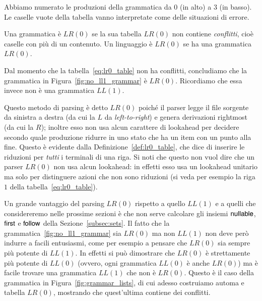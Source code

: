 Abbiamo numerato le produzioni della grammatica da $0$ (in alto)
a $3$ (in basso). Le caselle vuote della tabella vanno interpretate come delle
situazioni di errore.
%
\begin{definition}\label{def:lr0_grammar}
Una grammatica \`e $\mathit{LR}(0)$ se la sua tabella $\mathit{LR}(0)$
non contiene
\emph{conflitti},
cio\`e caselle con pi\`u di un contenuto. Un linguaggio \`e $\mathit{LR}(0)$ se
ha una grammatica $\mathit{LR}(0)$.
\end{definition}
%
\noindent
Dal momento che la tabella~\eqref{eq:lr0_table} non ha conflitti, concludiamo
che la grammatica in Figura~\ref{fig:no_ll1_grammar} \`e $\mathit{LR}(0)$.
Ricordiamo che essa invece non \`e una grammatica $\mathit{LL}(1)$.

Questo metodo di parsing \`e detto $\mathit{LR}(0)$ poich\'e il parser
legge il file sorgente da sinistra a destra (da cui la
$L$ da \emph{left-to-right}) e genera derivazioni rightmost (da cui la
$R$); inoltre esso non usa alcun carattere di lookahead per decidere
secondo quale produzione ridurre in uno stato che ha un item
con un punto alla fine. Questo \`e evidente dalla
Definizione~\ref{def:lr0_table}, che dice di inserire le riduzioni
per \emph{tutti} i terminali di una riga. Si noti che questo non vuol
dire che un parser $\mathit{LR}(0)$ non usa alcun lookahead: in effetti esso
usa un lookahead unitario ma solo per distinguere azioni che non
sono riduzioni (si veda per esempio la riga $1$ della
tabella~\eqref{eq:lr0_table}).

Un grande vantaggio del parsing $\mathit{LR}(0)$ rispetto a quello
$\mathit{LL}(1)$
e a quelli che considereremo nelle prossime sezioni \`e che non serve calcolare
gli insiemi $\mathsf{nullable}$, $\mathsf{first}$ e $\mathsf{follow}$ della Sezione~\ref{subsec:sets}.
Il fatto che la grammatica~\ref{fig:no_ll1_grammar} sia $\mathit{LR}(0)$ ma non
$\mathit{LL}(1)$ non deve per\`o indurre a facili entusiasmi,
come per esempio a pensare che $\mathit{LR}(0)$ sia sempre pi\`u potente
di $\mathit{LL}(1)$. In effetti si pu\`o dimostrare che $\mathit{LR}(0)$
\`e strettamente
pi\`u potente di $\mathit{LL}(0)$ (ovvero, ogni grammatica $\mathit{LL}(0)$
\`e anche
$\mathit{LR}(0)$) ma \`e facile trovare una grammatica $\mathit{LL}(1)$ che
non \`e $\mathit{LR}(0)$.
Questo \`e il caso della grammatica in Figura~\ref{fig:grammar_lists},
di cui adesso costruiamo automa e tabella $\mathit{LR}(0)$, mostrando
che quest'ultima contiene dei conflitti.

